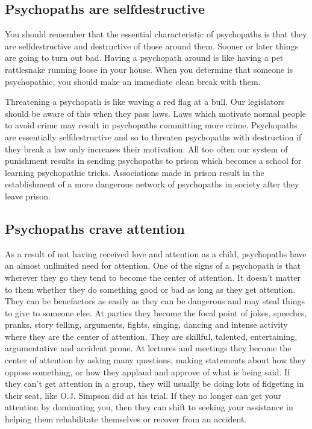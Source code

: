 \documentclass[a5paper,10pt,english]{book}
\begin{document}
\subsection{Psychopaths are self\sphinxhyphen{}destructive}
\label{\detokenize{psychopaths:psychopaths-are-self-destructive}}
\sphinxAtStartPar
You should remember that the essential characteristic of psychopaths is
that they are self\sphinxhyphen{}destructive and destructive of those around them.
Sooner or later things are going to turn out bad. Having a psychopath
around is like having a pet rattlesnake running loose in your house.
When you determine that someone is psychopathic, you should make an
immediate clean break with them.

\sphinxAtStartPar
Threatening a psychopath is like waving a red flag at a bull. Our
legislators should be aware of this when they pass laws. Laws which
motivate normal people to avoid crime may result in psychopaths
committing more crime. Psychopaths are essentially self\sphinxhyphen{}destructive and
so to threaten psychopaths with destruction if they break a law only
increases their motivation. All too often our system of punishment
results in sending psychopaths to prison which becomes a school for
learning psychopathic tricks. Associations made in prison result in the
establishment of a more dangerous network of psychopaths in society
after they leave prison.


\subsection{Psychopaths crave attention}
\label{\detokenize{psychopaths:psychopaths-crave-attention}}
\sphinxAtStartPar
As a result of not having received love and attention as a child,
psychopaths have an almost unlimited need for attention. One of the
signs of a psychopath is that wherever they go they tend to become the
center of attention. It doesn’t matter to them whether they do something
good or bad as long as they get attention. They can be benefactors as
easily as they can be dangerous and may steal things to give to someone
else. At parties they become the focal point of jokes, speeches, pranks,
story telling, arguments, fights, singing, dancing and intense activity
where they are the center of attention. They are skillful, talented,
entertaining, argumentative and accident prone. At lectures and meetings
they become the center of attention by asking many questions, making
statements about how they oppose something, or how they applaud and
approve of what is being said. If they can’t get attention in a group,
they will usually be doing lots of fidgeting in their seat, like O.J.
Simpson did at his trial. If they no longer can get your attention by
dominating you, then they can shift to seeking your assistance in
helping them rehabilitate themselves or recover from an accident.
\end{document}
